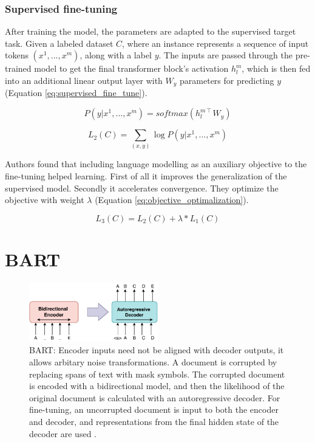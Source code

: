 \subsubsection{Supervised fine-tuning}
After training the model, the parameters are adapted to the supervised target task. Given a labeled dataset $C$, where an instance represents a sequence of input tokens $(x^1, ... , x^m)$, along with a label $y$. The inputs are passed through the pre-trained model to get the final transformer block's activation $h_l^m$, which is then fed into an additional linear output layer with $W_y$ parameters for predicting $y$ (Equation \ref{eq:supervised_fine_tune}). 

\begin{equation} \label{eq:supervised_fine_tune}
P(y|x^1, ... , x^m) = softmax(h_l^{m\intercal} W_y)
\end{equation}

\begin{equation} \label{eq:supervised_maximize}
L_2(C) = \sum_{(x,y)} \log P(y|x^1, ... , x^m)
\end{equation}

Authors found that including language modelling as an auxiliary objective to the fine-tuning helped learning. First of all it improves the generalization of the supervised model. Secondly it accelerates convergence. They optimize the objective with weight $\lambda$ (Equation \ref{eq:objective_optimalization}).

\begin{equation} \label{eq:objective_optimalization}
L_3(C) = L_2(C) + \lambda * L_1(C)
\end{equation}

\section{BART} \label{bart_section}

\begin{figure}[hbt]
  \centering
  \includegraphics[width=0.5\textwidth]{figures/BART.pdf}
  \caption{BART: Encoder inputs need not be aligned with decoder outputs, it allows arbitary noise transformations. A document is corrupted by replacing spans of text with mask symbols. The corrupted document is encoded with a bidirectional model, and then the likelihood of the original document is calculated with an autoregressive decoder. For fine-tuning, an uncorrupted document is input to both the encoder and decoder, and representations from the final hidden state of the decoder are used \cite{lewis2019bart}.}
  \label{fig:bart}
\end{figure}

